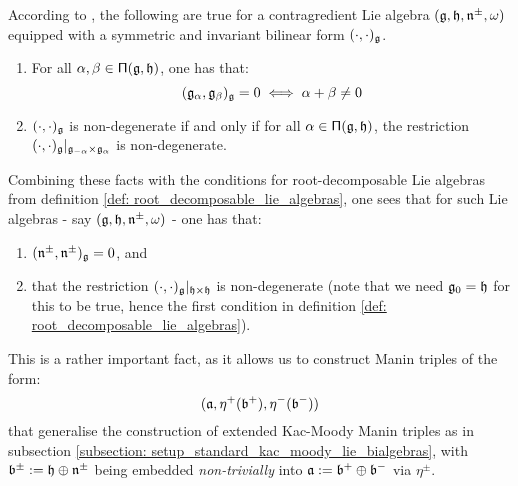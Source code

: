         \begin{remark} \label{remark: isotropic_subalgebras_of_root_decomopsable_lie_algebras}
            According to \cite[Proposition 4.4.2]{moody_pianzola_lie_algebras_with_triangular_decompositions}, the following are true for a contragredient Lie algebra $(\mathfrak{g}, \mathfrak{h}, \mathfrak{n}^{\pm}, \omega)$ equipped with a symmetric and invariant bilinear form $(\cdot, \cdot)_{\mathfrak{g}}$.
            \begin{enumerate}
                \item For all $\alpha, \beta \in \mathsf{\Pi}(\mathfrak{g}, \mathfrak{h})$, one has that:
                    $$( \mathfrak{g}_{\alpha}, \mathfrak{g}_{\beta} )_{\mathfrak{g}} = 0 \iff \alpha + \beta \not = 0$$
                \item $(\cdot, \cdot)_{\mathfrak{g}}$ is non-degenerate if and only if for all $\alpha \in \mathsf{\Pi}(\mathfrak{g}, \mathfrak{h})$, the restriction $(\cdot, \cdot)_{\g}|_{\g_{-\alpha} \x \g_{\alpha}}$ is non-degenerate.
            \end{enumerate}

            Combining these facts with the conditions for root-decomposable Lie algebras from definition \ref{def: root_decomposable_lie_algebras}, one sees that for such Lie algebras - say $(\mathfrak{g}, \mathfrak{h}, \mathfrak{n}^{\pm}, \omega)$ - one has that:
            \begin{enumerate}
                \item $(\mathfrak{n}^{\pm}, \mathfrak{n}^{\pm})_{\mathfrak{g}} = 0$, and
                \item that the restriction $(\cdot, \cdot)_{\g}|_{\h \x \h}$ is non-degenerate (note that we need $\mathfrak{g}_0 = \mathfrak{h}$ for this to be true, hence the first condition in definition \ref{def: root_decomposable_lie_algebras}).
            \end{enumerate}
            This is a rather important fact, as it allows us to construct Manin triples of the form:
                $$(\mathfrak{a}, \eta^+(\mathfrak{b}^+), \eta^-(\mathfrak{b}^-))$$
            that generalise the construction of extended Kac-Moody Manin triples as in subsection \ref{subsection: setup_standard_kac_moody_lie_bialgebras}, with $\mathfrak{b}^{\pm} := \mathfrak{h} \oplus \mathfrak{n}^{\pm}$ being embedded \textit{non-trivially} into $\mathfrak{a} := \mathfrak{b}^+ \oplus \mathfrak{b}^-$ via $\eta^{\pm}$.
        \end{remark}
        
